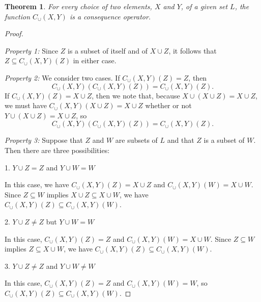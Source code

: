 \documentclass[12pt]{article}
\newtheorem{theorem}{Theorem}
\begin{document}
\begin{theorem} 
For every choice of two elements, $X$ and $Y$, of a given set $L$, the 
function $C_\cup (X,Y)$ is a consequence operator.
\end{theorem}

\begin{proof} ~

\emph{Property 1:}
Since $Z$ is a subset of itself and of $X \cup Z$, it follows that
$Z \subseteq C_\cup (X,Y) (Z)$ in either case.

\emph{Property 2:}
We consider two cases. If $C_\cup (X,Y) (Z) = Z$, then
 \[C_\cup (X,Y) (C_\cup (X,Y) (Z)) = C_\cup (X,Y) (Z).\]
If $C_\cup (X,Y) (Z) = X \cup Z$, then we note that, because 
$X \cup (X \cup Z) = X \cup Z$, we must have $C_\cup (X,Y) 
(X \cup Z) = X \cup Z$ whether or not $Y \cup (X \cup Z) = 
X \cup Z$, so 
 \[C_\cup (X,Y) (C_\cup (X,Y) (Z)) = C_\cup (X,Y) (Z).\]

\emph{Property 3:}
Suppose that $Z$ and $W$ are subsets of $L$ and that $Z$ is a subset
of $W$.  Then there are three possibilities: 

1. $Y \cup Z = Z$ and $Y \cup W = W$
 
In this case, we have $C_\cup (X,Y) (Z) = X \cup Z$ and
$C_\cup (X,Y) (W) = X \cup W$.  Since $Z \subseteq W$ implies 
$X \cup Z \subseteq X \cup W$, we have $C_\cup (X,Y) (Z) 
\subseteq C_\cup (X,Y) (W)$.

2. $Y \cup Z \not= Z$ but $Y \cup W = W$ 

In this case, $C_\cup (X,Y) (Z) = Z$ and $C_\cup (X,Y) (W) = X \cup W$. 
Since $Z \subseteq W$ implies $Z \subseteq X \cup W$, we have 
$C_\cup (X,Y) (Z) \subseteq C_\cup (X,Y) (W)$. 

3. $Y \cup Z \not= Z$ and $Y \cup W \not= W$

In this case, $C_\cup (X,Y) (Z) = Z$ and $C_\cup (X,Y) (W) = W$, 
so $C_\cup (X,Y) (Z) \subseteq C_\cup (X,Y) (W)$.
\end{proof}
\end{document}
